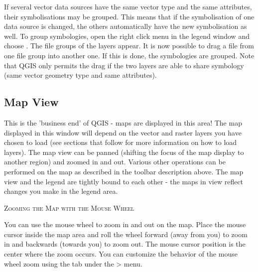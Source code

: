 If several vector data sources have the same vector type and the same
attributes, their symbolisations may be grouped. This means that if the
symbolisation of one data source is changed, the others automatically have
the new symbolisation as well. To group symbologies, open the right click
menu in the legend window and choose . The file
groups of the layers appear. It is now possible to drag a file from one file
group into another one. If this is done, the symbologies are grouped. Note
that QGIS only permits the drag if the two layers are able to share 
symbology (same vector geometry type and same attributes).  

%

\subsection{Map View}\label{label_mapview}

This is the 'business end' of QGIS - maps are displayed in this area! The
map displayed in this window will depend on the vector and raster layers you
have chosen to load (see sections that follow for more information on how to
load layers). The map view can be panned (shifting the focus of the map display
to another region) and zoomed in and out. Various other operations can be
performed on the map as described in the toolbar description above.  The map
view and the legend are tightly bound to each other - the maps in view reflect
changes you make in the legend area.  

\begin{Tip}\caption{\textsc{Zooming the Map with the Mouse
Wheel}}
You can use the mouse wheel to zoom in and out on the map. Place
the mouse cursor inside the map area and roll the wheel forward (away from you) to
zoom in and backwards (towards you) to zoom out. The mouse cursor position is the 
center where the zoom occurs. You can customize the behavior of the mouse
wheel zoom using the  tab under the  >
 menu.
\end{Tip}

